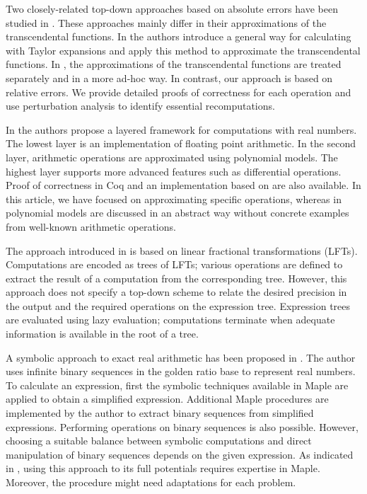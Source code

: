 \documentclass{article}
\numberwithin{mytheorem}{section}
\begin{document}
Two closely-related top-down approaches based on absolute errors have been studied in \cite{GL00,M05}. These approaches mainly differ in their approximations of the transcendental functions. In \cite{GL00} the authors introduce a general way for calculating with Taylor expansions and apply this method to approximate the transcendental functions. In \cite{M05}, the approximations of the transcendental functions are treated separately and in a more ad-hoc way. In contrast, our approach is based on relative errors. We provide detailed proofs of correctness for each operation and use perturbation analysis to identify essential recomputations.

In \cite{CNR11} the authors propose a layered framework for  computations with real numbers. The lowest layer is an implementation of floating point arithmetic. In the second layer, arithmetic operations are approximated using polynomial models. The highest layer supports more advanced features such as differential operations. Proof of correctness in Coq and an implementation based on \cite{CNR11} are also available. In this article, we have focused on approximating specific operations, whereas in \cite{CNR11} polynomial models are discussed in an abstract way without concrete examples from well-known arithmetic operations. 

The approach introduced in \cite{P98} is based on linear fractional transformations (LFTs). Computations are encoded as trees of LFTs; various operations are defined to extract the result of a computation from the corresponding tree. However, this approach does not specify a top-down scheme to relate the desired precision in the output and the required operations on the expression tree. Expression trees are evaluated using lazy evaluation; computations terminate when adequate information is available in the root of a tree. 

A symbolic approach to exact real arithmetic has been proposed in \cite{K00}. The author uses infinite binary sequences in the golden ratio base to represent real numbers. To calculate an expression, first the symbolic techniques available in Maple are applied to obtain a simplified expression. Additional Maple procedures are implemented by the author to extract binary sequences from simplified expressions. Performing operations on binary sequences is also possible. However, choosing a suitable balance between symbolic computations and direct manipulation of binary sequences depends on the given expression. As indicated in \cite{K00}, using this approach to its full potentials requires expertise in Maple. Moreover, the procedure might need adaptations for each problem. 
\end{document}
